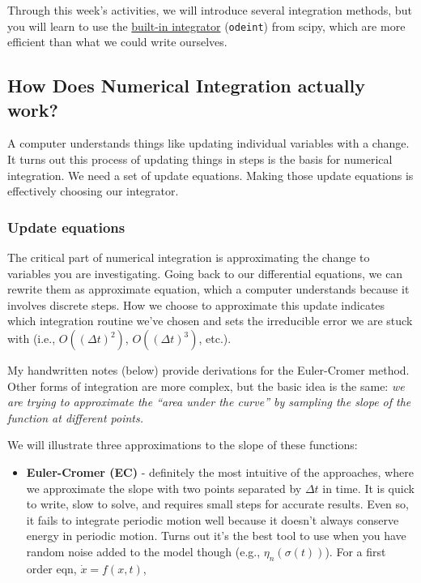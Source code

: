 Through this week's activities, we will introduce several integration
methods, but you will learn to use the
\href{https://docs.scipy.org/doc/scipy/reference/generated/scipy.integrate.odeint.html?highlight=odeint}{built-in
integrator} (\texttt{odeint}) from scipy, which are more efficient than
what we could write ourselves.

\subsection{How Does Numerical Integration actually
work?}\label{how-does-numerical-integration-actually-work}

A computer understands things like updating individual variables with a
change. It turns out this process of updating things in steps is the
basis for numerical integration. We need a set of update equations.
Making those update equations is effectively choosing our integrator.

\subsubsection{Update equations}\label{update-equations}

The critical part of numerical integration is approximating the change
to variables you are investigating. Going back to our differential
equations, we can rewrite them as approximate equation, which a computer
understands because it involves discrete steps. How we choose to
approximate this update indicates which integration routine we've chosen
and sets the irreducible error we are stuck with (i.e.,
\(O((\Delta t)^2)\), \(O((\Delta t)^3)\), etc.).

My handwritten notes (below) provide derivations for the Euler-Cromer
method. Other forms of integration are more complex, but the basic idea
is the same: \emph{we are trying to approximate the ``area under the
curve'' by sampling the slope of the function at different points.}

We will illustrate three approximations to the slope of these functions:

\begin{itemize}
\tightlist
\item
  \textbf{Euler-Cromer (EC)} - definitely the most intuitive of the
  approaches, where we approximate the slope with two points separated
  by \(\Delta t\) in time. It is quick to write, slow to solve, and
  requires small steps for accurate results. Even so, it fails to
  integrate periodic motion well because it doesn't always conserve
  energy in periodic motion. Turns out it's the best tool to use when
  you have random noise added to the model though (e.g.,
  \(\eta_n(\sigma(t))\)). For a first order eqn, \(\dot{x}=f(x,t)\),
\end{itemize}

